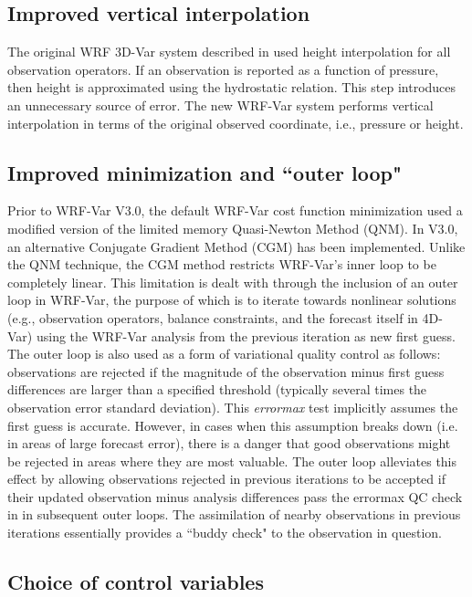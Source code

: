\subsection{Improved vertical interpolation}

The original WRF 3D-Var system described in \citet{barker04} used height 
interpolation for all observation operators. If an observation is reported as a 
function of pressure, then height is approximated using the 
hydrostatic relation. This step introduces an unnecessary source of error. 
The new WRF-Var system performs vertical interpolation in terms of the 
original observed coordinate, i.e., pressure or height.

\subsection{Improved minimization and ``outer loop"}

Prior to WRF-Var V3.0, the default WRF-Var cost function minimization used a modified 
version of the limited memory Quasi-Newton Method (QNM). In V3.0, an alternative 
Conjugate Gradient Method (CGM) has been implemented. Unlike the QNM technique, 
the CGM method restricts WRF-Var's inner loop to be completely linear. This limitation is dealt 
with through the inclusion of an outer loop in WRF-Var, the purpose of which is to iterate towards 
nonlinear solutions (e.g., observation operators, balance constraints, and the forecast itself in 
4D-Var) using the WRF-Var analysis from the previous iteration as new first guess. The 
outer loop is also used as a form of variational quality control as follows: observations are 
rejected if the magnitude of the observation minus first guess differences are larger than a 
specified threshold (typically several times the observation error standard deviation). This {\it errormax} test implicitly assumes the first guess is accurate. However, in cases when this assumption breaks
down (i.e. in areas of large forecast error), there is a danger that good observations might be rejected in areas where they are most valuable. The outer loop alleviates this effect by allowing observations 
rejected in previous iterations to be accepted if their updated observation minus analysis differences
pass the errormax QC check in in subsequent outer loops. The assimilation of nearby observations in previous iterations essentially provides a ``buddy check" to the observation in question.
 
\subsection{Choice of control variables}
\label{var-cvs}


